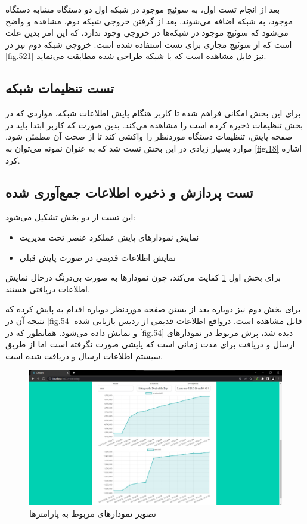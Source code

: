 بعد از انجام تست اول، به سوئیچ موجود در شبکه اول دو دستگاه مشابه دستگاه موجود، به شبکه اضافه می‌شوند. بعد از گرفتن خروجی شبکه دوم، مشاهده و واضح می‌شود که سوئیچ موجود در شبکه‌ها در خروجی وجود ندارد، که این امر بدین علت است که از سوئیچ مجازی برای تست استفاده شده است. خروجی شبکه دوم نیز در \cref{fig.521} نیز قابل مشاهده است که با شبکه طراحی شده مطابقت می‌نماید.


\cleardoublepage


\subsection{تست تنظیمات شبکه}

برای این بخش امکانی فراهم شده تا کاربر هنگام پایش اطلاعات شبکه، مواردی که در بخش تنظیمات ذخیره کرده است را مشاهده می‌کند. بدین صورت که کاربر ابتدا باید در صفحه پایش، تنظیمات دستگاه موردنظر را واکشی کند تا از صحت آن مطمئن شود. موارد بسیار زیادی در این بخش تست شد که به عنوان نمونه می‌توان به \cref{fig.18} اشاره کرد.


\subsection{تست پردازش و ذخیره اطلاعات جمع‌آوری شده}

این تست از دو بخش تشکیل می‌شود:

\begin{itemize}
    \item نمایش نمودارهای پایش عملکرد عنصر تحت مدیریت
    \item نمایش اطلاعات قدیمی در صورت پایش قبلی
\end{itemize}

برای بخش اول \cref{fig.53} کفایت می‌کند، چون نمودارها به صورت بی‌درنگ درحال نمایش اطلاعات دریافتی هستند.


برای بخش دوم نیز دوباره بعد از بستن صفحه موردنظر دوباره اقدام به پایش کرده که نتیجه آن در \cref{fig.54} قابل مشاهده است. درواقع اطلاعات قدیمی از ردیس بازیابی شده و نمایش داده می‌شود. همانطور که در \cref{fig.54} دیده شد، پرش مربوط در نمودارهای ارسال و دریافت برای مدت زمانی است که پایشی صورت نگرفته است اما از طریق سیستم اطلاعات ارسال و دریافت شده است.

\begin{figure}[!h]
    \centering\includegraphics[scale=.38]{./monitoring-before}
    \caption{تصویر نمودارهای مربوط به پارامترها}\label{fig.53}
\end{figure}


